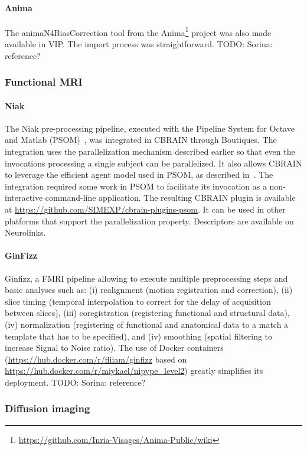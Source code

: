 \documentclass[a4paper,num-refs]{oup-contemporary}
\newcommand{\todo}[1]{\color{red}TODO: #1\color{black}}
\newcommand{\boutiques}{Boutiques\xspace}
\begin{document}
\paragraph{Anima}
The animaN4BiasCorrection tool from the
Anima\footnote{\url{https://github.com/Inria-Visages/Anima-Public/wiki}} project was also made available 
in VIP. The import process was straightforward. \todo{Sorina: reference?}

\subsubsection{Functional MRI}

\paragraph{Niak} The Niak pre-processing pipeline, executed with the Pipeline System
for Octave and Matlab (PSOM)~\cite{bellec2012pipeline}, was integrated
in CBRAIN through \boutiques. The integration uses the parallelization
mechanism described earlier so that even
the invocations processing a single subject can be parallelized. It also
allows CBRAIN to leverage the efficient agent model used in PSOM, as
described in~\cite{GLAT-16}. The integration required some work in
PSOM to facilitate its invocation as a non-interactive command-line
application. The resulting CBRAIN plugin is available at
\url{https://github.com/SIMEXP/cbrain-plugins-psom}. It can
be used in other platforms that support the parallelization
property. Descriptors are available on Neurolinks.

\paragraph{GinFizz}
Ginfizz, a FMRI pipeline allowing to execute multiple 
preprocessing steps and basic analyses such as: (i) realignment (motion registration and correction),
(ii) slice timing (temporal interpolation to correct for the delay of acquisition between slices), 
(iii) coregistration (registering functional and structural data), (iv) normalization (registering 
of functional and anatomical data to a match a template that has to be specified), and (iv)
smoothing (spatial filtering to increase Signal to Noise ratio). The use of Docker containers
(\url{https://hub.docker.com/r/fliiam/ginfizz} based on \url{https://hub.docker.com/r/miykael/nipype_level2}) 
greatly simplifies its deployment.
\todo{Sorina: reference?}

\subsubsection{Diffusion imaging}
\end{document}
